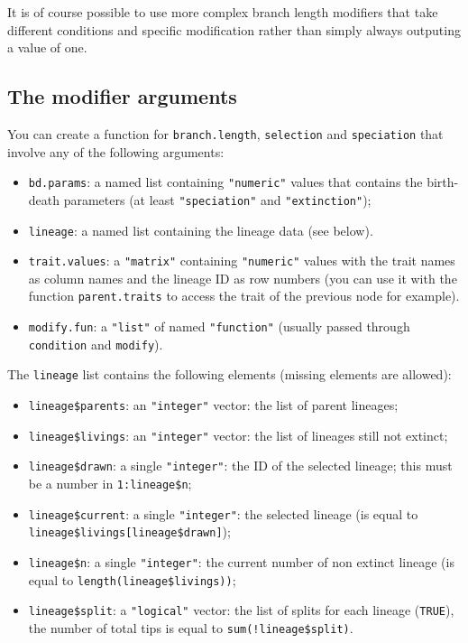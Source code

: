\documentclass[
]{book}
\providecommand{\tightlist}{%
  \setlength{\itemsep}{0pt}\setlength{\parskip}{0pt}}
\begin{document}
It is of course possible to use more complex branch length modifiers that take different conditions and specific modification rather than simply always outputing a value of one.

\hypertarget{allowarguments}{%
\subsection{The modifier arguments}\label{allowarguments}}

You can create a function for \texttt{branch.length}, \texttt{selection} and \texttt{speciation} that involve any of the following arguments:

\begin{itemize}
\tightlist
\item
  \texttt{bd.params}: a named list containing \texttt{"numeric"} values that contains the birth-death parameters (at least \texttt{"speciation"} and \texttt{"extinction"});
\item
  \texttt{lineage}: a named list containing the lineage data (see below).
\item
  \texttt{trait.values}: a \texttt{"matrix"} containing \texttt{"numeric"} values with the trait names as column names and the lineage ID as row numbers (you can use it with the function \texttt{parent.traits} to access the trait of the previous node for example).
\item
  \texttt{modify.fun}: a \texttt{"list"} of named \texttt{"function"} (usually passed through \texttt{condition} and \texttt{modify}).
\end{itemize}

The \texttt{lineage} list contains the following elements (missing elements are allowed):

\begin{itemize}
\tightlist
\item
  \texttt{lineage\$parents}: an \texttt{"integer"} vector: the list of parent lineages;
\item
  \texttt{lineage\$livings}: an \texttt{"integer"} vector: the list of lineages still not extinct;
\item
  \texttt{lineage\$drawn}: a single \texttt{"integer"}: the ID of the selected lineage; this must be a number in \texttt{1:lineage\$n};
\item
  \texttt{lineage\$current}: a single \texttt{"integer"}: the selected lineage (is equal to \texttt{lineage\$livings{[}lineage\$drawn{]}});
\item
  \texttt{lineage\$n}: a single \texttt{"integer"}: the current number of non extinct lineage (is equal to \texttt{length(lineage\$livings))};
\item
  \texttt{lineage\$split}: a \texttt{"logical"} vector: the list of splits for each lineage (\texttt{TRUE}), the number of total tips is equal to \texttt{sum(!lineage\$split)}.
\end{itemize}
\end{document}
